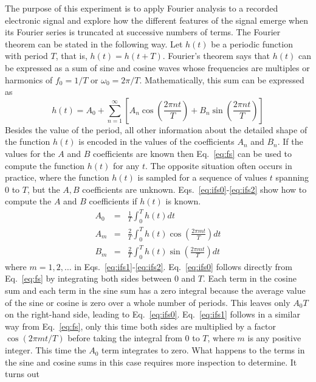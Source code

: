 \documentclass{revtex4}
\begin{document}
The purpose of this experiment is to apply Fourier analysis to a recorded
electronic signal and explore how the different features of the signal
emerge when its Fourier series is truncated at successive numbers of terms.
The Fourier theorem can be stated in the following way.
Let $h(t)$ be a periodic function with period $T$, that is, $h(t) = h(t + T)$.
Fourier's theorem says that $h(t)$ can be expressed as a sum of sine and
cosine waves whose frequencies are multiples or harmonics of $f_0 = 1/T$
or $\omega_0 = 2\pi/T$.  Mathematically, this sum can be expressed as
\begin{equation}
h(t) = A_0 + \sum_{n=1}^{\infty}\left[A_n\cos\left(\frac{2\pi nt}{T}\right)
+ B_n\sin\left(\frac{2\pi nt}{T}\right)\right]
\label{eq:fs}
\end{equation}
Besides the value of the period, all other information about the detailed
shape of the function $h(t)$ is encoded in the values of the coefficients
$A_n$ and $B_n$.  If the values for the $A$ and $B$ coefficients are known
then Eq.~\ref{eq:fs} can be used to compute the function $h(t)$ for any
$t$.  The opposite situation often occurs in practice, where the function
$h(t)$ is sampled for a sequence of values $t$ spanning 0 to $T$, but the
$A,B$ coefficients are unknown.  Eqs.~\ref{eq:ifs0}-\ref{eq:ifs2} show
how to compute the $A$ and $B$ coefficients if $h(t)$ is known.
\begin{eqnarray}
A_0 &=& \frac{1}{T}\int_{0}^{T}h(t) dt
\label{eq:ifs0} \\
A_m &=& \frac{2}{T}\int_{0}^{T}h(t)\cos\left(\frac{2\pi mt}{T}
\right) dt
\label{eq:ifs1} \\
B_m &=& \frac{2}{T}\int_{0}^{T}h(t)\sin\left(\frac{2\pi mt}{T}
\right) dt
\label{eq:ifs2}
\end{eqnarray}
where $m=1,2,\ldots$ in Eqs.~\ref{eq:ifs1}-\ref{eq:ifs2}.
Eq.~\ref{eq:ifs0} follows directly from Eq.~\ref{eq:fs} by integrating
both sides between 0 and $T$.  Each term in the cosine sum and each term
in the sine sum has a zero integral because  the average value of the
sine or cosine is zero over a whole number of periods.  This leaves only
$A_0T$ on the right-hand side, leading to Eq.~\ref{eq:ifs0}.
Eq.~\ref{eq:ifs1} follows in a similar way from Eq.~\ref{eq:fs}, only
this time both sides are multiplied by a factor $\cos(2\pi mt/T)$ before
taking the integral from 0 to $T$, where $m$ is any positive integer.
This time the $A_0$ term integrates to zero.
What happens to the terms in the sine and cosine
sums in this case requires more inspection to determine.  It turns out
\end{document}
